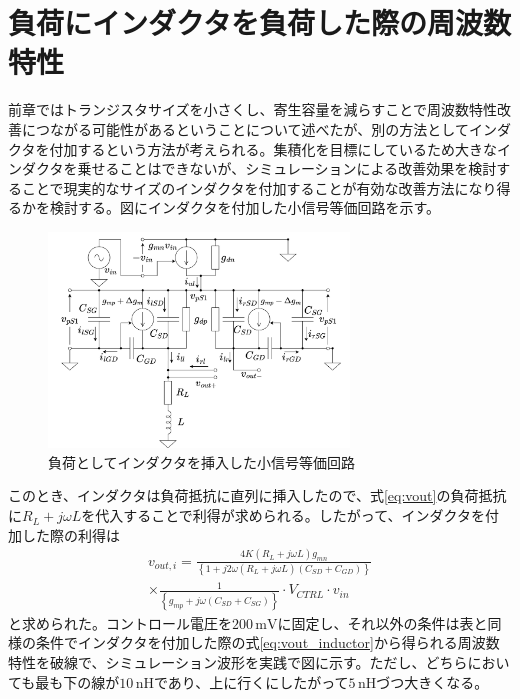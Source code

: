 \documentclass[twocolumn]{jsarticle}
\begin{document}
\section{負荷にインダクタを負荷した際の周波数特性}
    前章ではトランジスタサイズを小さくし、寄生容量を減らすことで周波数特性改善につながる可能性があるということについて述べたが、別の方法としてインダクタを付加するという方法が考えられる。集積化を目標にしているため大きなインダクタを乗せることはできないが、シミュレーションによる改善効果を検討することで現実的なサイズのインダクタを付加することが有効な改善方法になり得るかを検討する。図にインダクタを付加した小信号等価回路を示す。
    \begin{figure}[H]
        \begin{center}
            \includegraphics*[width = 80mm]{figures/ParasiticInductorHalfEquivalent.png}
            \caption{負荷としてインダクタを挿入した小信号等価回路}
            \label{fig:inductor}
        \end{center}
    \end{figure}
    このとき、インダクタは負荷抵抗に直列に挿入したので、式\eqref{eq:vout}の負荷抵抗に$R_{L}+j\omega L$を代入することで利得が求められる。したがって、インダクタを付加した際の利得は
    \begin{multline}
        v_{out,i} = \frac{4K(R_{L}+j\omega L)g_{mn}}{ \left\{ 1+j2\omega(R_{L}+j\omega L)(C_{SD}+C_{GD}) \right\}}\\
        \times\frac{1}{\left\{ g_{mp}+j\omega(C_{SD}+C_{SG}) \right\}} \cdot V_{CTRL}\cdot v_{in}   \label{eq:vout_inductor}
    \end{multline}
    と求められた。コントロール電圧を$200\,\mathrm{mV}$に固定し、それ以外の条件は表と同様の条件でインダクタを付加した際の式\eqref{eq:vout_inductor}から得られる周波数特性を破線で、シミュレーション波形を実践で図に示す。ただし、どちらにおいても最も下の線が$10\,\mathrm{nH}$であり、上に行くにしたがって$5\,\mathrm{nH}$づつ大きくなる。
\end{document}
